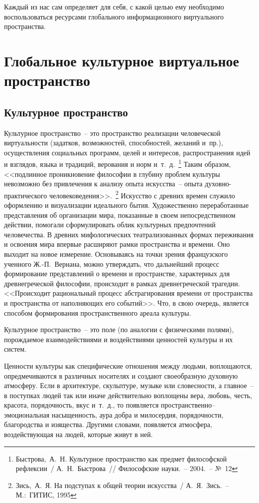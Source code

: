   Каждый из нас сам определяет для себя, с какой целью ему необходимо
  воспользоваться ресурсами глобального информационного виртуального
  пространства.
  
  \section{Глобальное культурное виртуальное пространство}
  \subsection{Культурное пространство}
  
  Культурное пространство~-- это пространство реализации человеческой
  виртуальности (задатков, возможностей, способностей, желаний и~пр.),
  осуществления социальных программ, целей и интересов, распространения идей и
  взглядов, языка и традиций, верования и норм и~т.~д.~\footnote{
    Быстрова,~А.~Н. Культурное пространство как предмет философской рефлексии~/
    А.~Н.~Быстрова~// Философские науки.~-- 2004.~-- №~12}
  Таким образом, <<подлинное проникновение философии в глубину проблем культуры
  невозможно без привлечения к анализу опыта искусства~-- опыта
  духовно-практического человековедения>>.~\footnote{
    Зись,~А.~Я. На подступах к общей теории искусства~/ А.~Я.~Зись.~--
    М.:~ГИТИС, 1995}
  Искусство с древних времен служило оформлению и визуализации идеального
  бытия. Художественно переработанные представления об организации мира,
  показанные в своем непосредственном действии, помогали сформулировать облик
  культурных предпочтений человечества. В древних мифологических
  театрализованных формах переживания и освоения мира впервые расширяют рамки
  пространства и времени. Оно выходит на новое измерение. Основываясь на точки
  зрения французского ученного Ж.-П.~Вернана, можно утверждать, что дальнейший
  процесс формирование представлений о времени и пространстве, характерных для
  древнегреческой философии, происходит в рамках древнегреческой трагедии.
  <<Происходит рациональный процесс абстрагирования времени от пространства и
  пространства от наполняющих его событий>>. Что, в свою очередь, является
  способом формирования пространственного ареала культуры.
  
  Культурное пространство~-- это поле (по аналогии с физическими полями),
  порождаемое взаимодействиями и воздействиями ценностей культуры и их систем.
  
  Ценности культуры как специфические отношения между людьми, воплощаются,
  опредмечиваются в различных носителях и создают своеобразную духовную
  атмосферу. Если в архитектуре, скульптуре, музыке или словесности, а
  главное~-- в поступках людей так или иначе действительно воплощены вера,
  любовь, честь, красота, порядочность, вкус и~т.~д., то появляется
  пространственно–эмоциональная насыщенность, аура добра и милосердия,
  порядочности, благородства и изящества. Другими словами, появляется
  атмосфера, воздействующая на людей, которые живут в ней.
  
